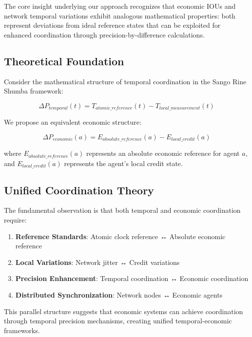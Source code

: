 \documentclass[12pt,a4paper]{article}
\begin{document}
The core insight underlying our approach recognizes that economic IOUs and network temporal variations exhibit analogous mathematical properties: both represent deviations from ideal reference states that can be exploited for enhanced coordination through precision-by-difference calculations.

\subsection{Theoretical Foundation}

Consider the mathematical structure of temporal coordination in the Sango Rine Shumba framework:

\begin{equation}
\Delta P_{temporal}(t) = T_{atomic\_reference}(t) - T_{local\_measurement}(t)
\end{equation}

We propose an equivalent economic structure:

\begin{equation}
\Delta P_{economic}(a) = E_{absolute\_reference}(a) - E_{local\_credit}(a)
\end{equation}

where $E_{absolute\_reference}(a)$ represents an absolute economic reference for agent $a$, and $E_{local\_credit}(a)$ represents the agent's local credit state.

\subsection{Unified Coordination Theory}

The fundamental observation is that both temporal and economic coordination require:
\begin{enumerate}
\item \textbf{Reference Standards}: Atomic clock reference ↔ Absolute economic reference
\item \textbf{Local Variations}: Network jitter ↔ Credit variations
\item \textbf{Precision Enhancement}: Temporal coordination ↔ Economic coordination
\item \textbf{Distributed Synchronization}: Network nodes ↔ Economic agents
\end{enumerate}

This parallel structure suggests that economic systems can achieve coordination through temporal precision mechanisms, creating unified temporal-economic frameworks.
\end{document}
